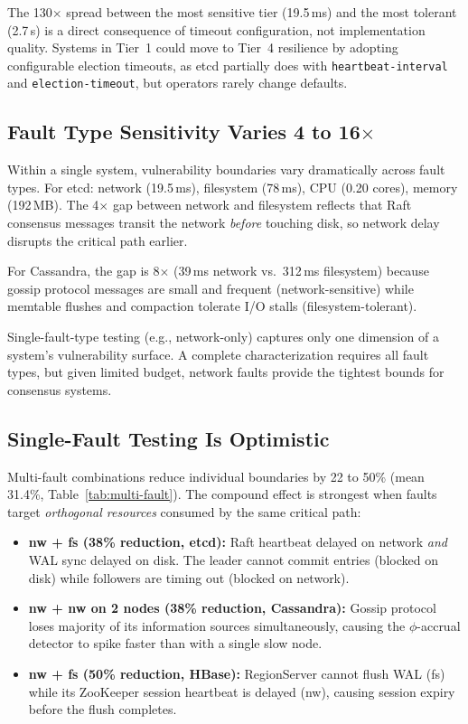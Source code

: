  The 130$\times$ spread between the most
sensitive tier (19.5\,ms) and the most tolerant (2.7\,s) is a direct
consequence of timeout configuration, not implementation quality. Systems
in Tier~1 could move to Tier~4 resilience by adopting configurable election
timeouts, as etcd partially does with \texttt{heartbeat-interval} and
\texttt{election-timeout}, but operators rarely change defaults.

\subsection{Fault Type Sensitivity Varies 4 to 16$\times$}
\label{sec:finding-sensitivity}

Within a single system, vulnerability boundaries vary dramatically across
fault types. For etcd: network (19.5\,ms), filesystem (78\,ms), CPU (0.20
cores), memory (192\,MB). The 4$\times$ gap between network and filesystem
reflects that Raft consensus messages transit the network \emph{before}
touching disk, so network delay disrupts the critical path earlier.

For Cassandra, the gap is 8$\times$ (39\,ms network vs.\ 312\,ms filesystem)
because gossip protocol messages are small and frequent (network-sensitive)
while memtable flushes and compaction tolerate I/O stalls (filesystem-tolerant).

 Single-fault-type testing (e.g., network-only)
captures only one dimension of a system's vulnerability surface. A complete
characterization requires all fault types, but given limited budget, network
faults provide the tightest bounds for consensus systems.

\subsection{Single-Fault Testing Is Optimistic}
\label{sec:finding-multi}

Multi-fault combinations reduce individual boundaries by 22 to 50\% (mean 31.4\%,
Table~\ref{tab:multi-fault}). The compound effect is strongest when faults
target \emph{orthogonal resources} consumed by the same critical path:

\begin{itemize}[leftmargin=*,topsep=2pt,itemsep=1pt]
  \item \textbf{nw + fs (38\% reduction, etcd):} Raft heartbeat delayed on
        network \emph{and} WAL sync delayed on disk. The leader cannot
        commit entries (blocked on disk) while followers are timing out
        (blocked on network).
  \item \textbf{nw + nw on 2 nodes (38\% reduction, Cassandra):} Gossip
        protocol loses majority of its information sources simultaneously,
        causing the $\phi$-accrual detector to spike faster than with a
        single slow node.
  \item \textbf{nw + fs (50\% reduction, HBase):} RegionServer cannot flush
        WAL (fs) while its ZooKeeper session heartbeat is delayed (nw),
        causing session expiry before the flush completes.
\end{itemize}

